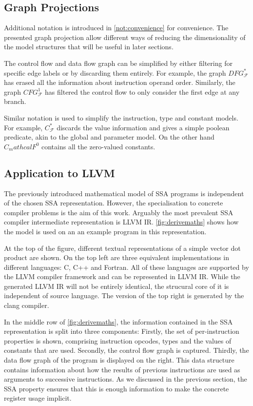 \subsection{Graph Projections}

    Additional notation is introduced in \autoref{not:convenience} for
    convenience.
    The presented graph projection allow different ways of reducing the
    dimensionality of the model structures that will be useful in later
    sections.

    The control flow and data flow graph can be simplified by either filtering
    for specific edge labels or by discarding them entirely.
    For example, the graph $DFG_\mathcal F^*$ has erased all the information
    about instruction operand order.
    Similarly, the graph $CFG_\mathcal F^1$ has filtered the control flow to
    only consider the first edge at any branch.

    Similar notation is used to simplify the instruction, type and constant
    models.
    For example, $C_\mathcal F^*$ discards the value information and gives a
    simple poolean predicate, akin to the global and parameter model.
    On the other hand $C_mathcal F^0$ contains all the zero-valued constants.

\subsection{Application to LLVM}

    The previously introduced mathematical model of SSA programs is independent
    of the chosen SSA representation.
    However, the specialisation to concrete compiler problems is the aim of this
    work.
    Arguably the most prevalent SSA compiler intermediate representation is
    LLVM IR.
    \autoref{fig:derivemaths} shows how the model is used on an an example
    program in this representation.

    At the top of the figure, different textual representations of a simple
    vector dot product are shown.
    On the top left are three equivalent implementations in different languages:
    C, C++ and Fortran.
    All of these languages are supported by the LLVM compiler framework and
    can be represented in LLVM IR.
    While the generated LLVM IR will not be entirely identical, the strucural
    core of it is independent of source language.
    The version of the top right is generated by the clang compiler.

    In the middle row of \autoref{fig:derivemaths}, the information contained in
    the SSA representation is split into three components:
    Firstly, the set of per-instruction properties is shown, comprising
    instruction opcodes, types and the values of constants that are used.
    Secondly, the control flow graph is captured.
    Thirdly, the data flow graph of the program is displayed on the right.
    This data structure contains information about how the results of previous
    instructions are used as arguments to successive instructions.
    As we discussed in the previous section, the SSA property ensures that this
    is enough information to make the concrete register usage implicit.

